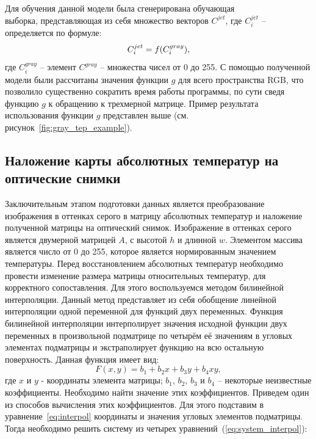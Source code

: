 \documentclass[14pt, a4paper]{extreport}
\begin{document}
	Для обучения данной модели была сгенерирована обучающая \\ выборка, представляющая из себя множество векторов $C^{jet}$, где $C^{jet}_{i}$ -- определяется по формуле:
	\vspace*{-0.3cm}
	\begin{equation}
		C^{jet}_{i} = f(C^{gray}_{i}),
		\label{eq:Cjetgray}
		\vspace*{-0.35cm}
	\end{equation}
	где $C^{gray}_{i}$ -- элемент $C^{gray}$ -- множества чисел от 0 до 255. С помощью полученной модели были рассчитаны значения функции $g$ для всего пространства RGB, что позволило существенно сократить время работы программы, по сути сведя функцию $g$ к обращению к трехмерной матрице. Пример результата использования функции $g$ представлен выше (см. рисунок~\ref{fig:gray_tep_example}).
	
	\subsection[\vspace*{-0.22cm}Наложение карты абсолютных температур на оптические \\ \hspace*{-1.15cm}снимки]{\vspace*{-0.22cm}Наложение карты абсолютных температур на \\ \hspace*{-3.75cm}оптические снимки}	
	Заключительным этапом подготовки данных является преобразование изображения в оттенках серого в матрицу абсолютных температур и наложение полученной матрицы на оптический снимок. Изображение в оттенках серого является двумерной матрицей $A$, с высотой $h$ и длинной $w$. Элементом массива является число от 0 до 255, которое является нормированным значением температуры.
	Перед восстановлением абсолютных температур необходимо провести изменение размера матрицы относительных температур, для корректного сопоставления. Для этого воспользуемся методом билинейной интерполяции. Данный метод представляет из себя обобщение линейной интерполяции одной переменной для функций двух переменных. Функция билинейной интерполяции интерполирует значения исходной функции двух переменных в произвольной подматрице по четырём её значениям в угловых элементах подматрицы и экстраполирует функцию на всю остальную поверхность. Данная функция имеет вид: 
	\begin{equation}
		F(x,y)=b_{1}+b_{2} x+b_{3} y+b_{4} x y,
		\label{eq:interpol}
	\end{equation}
	где $x$ и $y$ - координаты элемента матрицы; $b_1$, $b_2$, $b_3$ и $b_4$ -- некоторые неизвестные коэффициенты. Необходимо найти значение этих коэффициентов. Приведем один из способов вычисления этих коэффициентов. Для этого подставим в уравнение~\ref{eq:interpol} координаты и значения угловых 
	элементов подматрицы. Тогда необходимо решить систему из четырех уравнений~(\ref{eq:system_interpol}):
	
\end{document}

